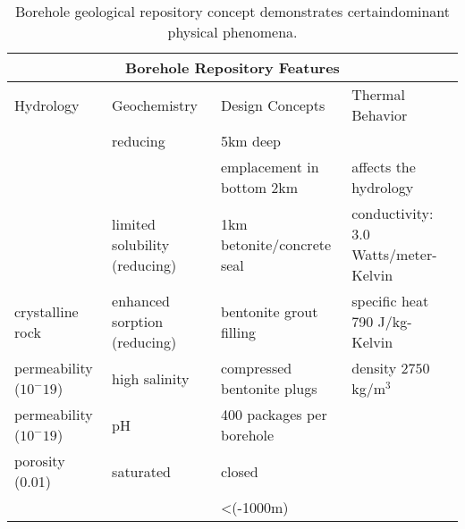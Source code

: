 %
\begin{table}[h!]
  \centering
  \footnotesize{
  \begin{tabular}{|l|l|l|l|}
    \multicolumn{4}{c}{\textbf{Borehole Repository Features}}\\
    \hline
    Hydrology & Geochemistry & Design Concepts & Thermal Behavior \\ 
    \hline
    &reducing&5km deep&\\
    &&emplacement in bottom 2km&affects the hydrology\\
    &limited solubility (reducing)&1km betonite/concrete seal &conductivity: 3.0 Watts/meter-Kelvin\\
    crystalline rock&enhanced sorption (reducing)&bentonite grout filling&specific heat 790 J/kg-Kelvin\\
    permeability ($10^-19$)&high salinity&compressed bentonite plugs&density $2750 $kg/m$^3$\\
    permeability ($10^-19$)&pH&400 packages per borehole&\\
    porosity (0.01)&saturated&closed&\\
    &&<(-1000m)&\\
    \hline
  \end{tabular}
  \caption[Borehole Repository Features]{Borehole geological repository 
  concept demonstrates certaindominant physical phenomena. }
  \label{tab:borehole_tab}
  }
\end{table}


